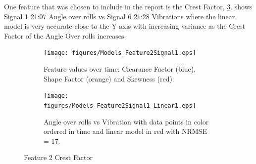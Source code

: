 \documentclass[]{article}
\begin{document}
One feature that was chosen to include in the report is the Crest Factor, \cref{fig:Models_Feature2Signal1_Caption}.  shows Signal 1 21:07 Angle over rolls vs Signal 6 21:28 Vibrations where the linear model is very accurate close to the Y axis with increasing variance as the Crest Factor of the Angle Over rolls increases.

\begin{figure}[H]
    \centering
	\begin{subfigure}[t]{.45\textwidth}
		\centering
		\texttt{[image: figures/Models\_Feature2Signal1.eps]}
		\caption{Feature values over time: Clearance Factor (blue), Shape Factor (orange) and Skewness (red).}
		\label{fig:Models_Feature2Signal9}
	\end{subfigure}
	\hspace*{\fill}%
	\begin{subfigure}[t]{.45\textwidth}
		\centering
 		\texttt{[image: figures/Models\_Feature2Signal1\_Linear1.eps]}
		\caption{Angle over rolls vs Vibration with data points in color ordered in time and linear model in red with \gls{NRMSE} = 17.}
		\label{fig:Models_Feature2Signal1_Linear1}
	\end{subfigure}
    \caption{Feature 2 Crest Factor}
    \label{fig:Models_Feature2Signal1_Caption}
\end{figure}
\end{document}
